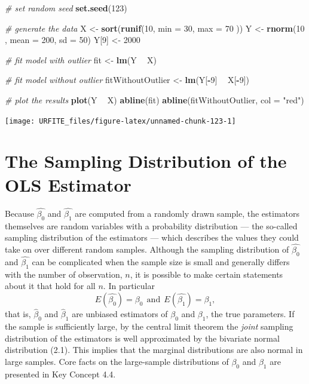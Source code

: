\documentclass[]{book}
\newenvironment{Shaded}{\begin{snugshade}}{\end{snugshade}}
\newcommand{\KeywordTok}[1]{\textcolor[rgb]{0.13,0.29,0.53}{\textbf{#1}}}
\newcommand{\DataTypeTok}[1]{\textcolor[rgb]{0.13,0.29,0.53}{#1}}
\newcommand{\DecValTok}[1]{\textcolor[rgb]{0.00,0.00,0.81}{#1}}
\newcommand{\StringTok}[1]{\textcolor[rgb]{0.31,0.60,0.02}{#1}}
\newcommand{\CommentTok}[1]{\textcolor[rgb]{0.56,0.35,0.01}{\textit{#1}}}
\newcommand{\OperatorTok}[1]{\textcolor[rgb]{0.81,0.36,0.00}{\textbf{#1}}}
\newcommand{\NormalTok}[1]{#1}
\theoremstyle{definition}
\theoremstyle{definition}
\theoremstyle{definition}
\theoremstyle{remark}
\begin{document}
\begin{Shaded}
\begin{Highlighting}[]
\CommentTok{# set random seed}
\KeywordTok{set.seed}\NormalTok{(}\DecValTok{123}\NormalTok{)}

\CommentTok{# generate the data}
\NormalTok{X <-}\StringTok{ }\KeywordTok{sort}\NormalTok{(}\KeywordTok{runif}\NormalTok{(}\DecValTok{10}\NormalTok{, }\DataTypeTok{min =} \DecValTok{30}\NormalTok{, }\DataTypeTok{max =} \DecValTok{70}\NormalTok{ ))}
\NormalTok{Y <-}\StringTok{ }\KeywordTok{rnorm}\NormalTok{(}\DecValTok{10}\NormalTok{ , }\DataTypeTok{mean =} \DecValTok{200}\NormalTok{, }\DataTypeTok{sd =} \DecValTok{50}\NormalTok{)}
\NormalTok{Y[}\DecValTok{9}\NormalTok{] <-}\StringTok{ }\DecValTok{2000}

\CommentTok{# fit model with outlier}
\NormalTok{fit <-}\StringTok{ }\KeywordTok{lm}\NormalTok{(Y }\OperatorTok{~}\StringTok{ }\NormalTok{X)}

\CommentTok{# fit model without outlier}
\NormalTok{fitWithoutOutlier <-}\StringTok{ }\KeywordTok{lm}\NormalTok{(Y[}\OperatorTok{-}\DecValTok{9}\NormalTok{] }\OperatorTok{~}\StringTok{ }\NormalTok{X[}\OperatorTok{-}\DecValTok{9}\NormalTok{])}

\CommentTok{# plot the results}
\KeywordTok{plot}\NormalTok{(Y }\OperatorTok{~}\StringTok{ }\NormalTok{X)}
\KeywordTok{abline}\NormalTok{(fit)}
\KeywordTok{abline}\NormalTok{(fitWithoutOutlier, }\DataTypeTok{col =} \StringTok{"red"}\NormalTok{)}
\end{Highlighting}
\end{Shaded}

\begin{center}\texttt{[image: URFITE\_files/figure-latex/unnamed-chunk-123-1]} \end{center}

\hypertarget{tsdotoe}{\section{The Sampling Distribution of the OLS
Estimator}\label{tsdotoe}}

Because \(\hat{\beta_0}\) and \(\hat{\beta_1}\) are computed from a
randomly drawn sample, the estimators themselves are random variables
with a probability distribution --- the so-called sampling distribution
of the estimators --- which describes the values they could take on over
different random samples. Although the sampling distribution of
\(\hat{\beta_0}\) and \(\hat{\beta_1}\) can be complicated when the
sample size is small and generally differs with the number of
observation, \(n\), it is possible to make certain statements about it
that hold for all \(n\). In particular
\[ E(\hat{\beta_0}) = \beta_0 \ \ \text{and} \ \  E(\hat{\beta_1}) = \beta_1,\]
that is, \(\hat\beta_0\) and \(\hat\beta_1\) are unbiased estimators of
\(\beta_0\) and \(\beta_1\), the true parameters. If the sample is
sufficiently large, by the central limit theorem the \emph{joint}
sampling distribution of the estimators is well approximated by the
bivariate normal distribution (2.1). This implies that the marginal
distributions are also normal in large samples. Core facts on the
large-sample distributions of \(\beta_0\) and \(\beta_1\) are presented
in Key Concept 4.4.
\end{document}
